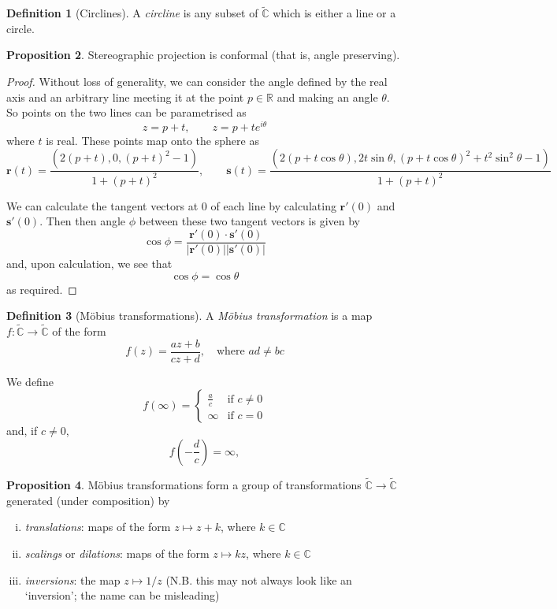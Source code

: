 \documentclass[10pt,fleqn]{article}
\newcommand{\comps}{\mathbb{C}}
\newcommand{\reals}{\mathbb{R}}
\newcommand{\vc}[1]{\boldsymbol{#1}}
\theoremstyle{definition} \newtheorem{defn}{Definition}[section]
\theoremstyle{plain}      \newtheorem{thm}[defn]{Theorem}
\theoremstyle{definition} \newtheorem{prop}[defn]{Proposition}
\theoremstyle{plain}      \newtheorem{lem}[defn]{Lemma}
\theoremstyle{definition} \newtheorem{cor}[defn]{Corollary}
\theoremstyle{definition} \newtheorem{ex}[defn]{Example}
\theoremstyle{definition} \newtheorem{rem}[defn]{Remark}
\begin{document}
\begin{defn}[Circlines]
    A \emph{circline} is any subset of $\tilde{\comps}$ which is either a line or a circle.
\end{defn}

\begin{prop}
    Stereographic projection is conformal (that is, angle preserving).
\end{prop}

\begin{proof}
    Without loss of generality, we can consider the angle defined by the real axis and an arbitrary line meeting it at the point $p\in\reals$ and making an angle $\theta$.
    So points on the two lines can be parametrised as
    \[
        z=p+t,\qquad
        z=p+te^{i\theta}
    \]
    where $t$ is real.
    These points map onto the sphere as
    \[
        \vc{r}(t)=
        \frac{(2(p+t),0,(p+t)^2-1)}{1+(p+t)^2},\qquad
        \vc{s}(t)=
        \frac{(2(p+t\cos\theta),2t\sin\theta,(p+t\cos\theta)^2+t^2\sin^2\theta-1)}{1+(p+t)^2}
    \]

    We can calculate the tangent vectors at $0$ of each line by calculating $\vc{r}'(0)$ and $\vc{s}'(0)$.
    Then then angle $\phi$ between these two tangent vectors is given by
    \[
        \cos\phi=
        \frac{\vc{r}'(0)\cdot\vc{s}'(0)}{|\vc{r}'(0)||\vc{s}'(0)|}
    \]
    and, upon calculation, we see that
    \[
        \cos\phi=
        \cos\theta
    \]
    as required.
\end{proof}

\begin{defn}[M\"obius transformations]
    A \emph{M\"obius transformation} is a map $f:\tilde{\comps}\to\tilde{\comps}$ of the form
    \begin{equation}
        f(z)=
        \frac{az+b}{cz+d},\quad
        \text{where }ad\neq bc
    \end{equation}

    We define
    \[
        f(\infty)=
        \left\{
        \begin{array}{lr}
            \frac{a}{c} & \text{if }c\neq0\\
            \infty & \text{if }c=0
        \end{array}
        \right.
    \]
    and, if $c\neq0$,
    \[
        f(-\frac{d}{c})=
        \infty,
    \]
\end{defn}

\begin{prop}
    M\"obius transformations form a group of transformations $\tilde{\comps}\to\tilde{\comps}$ generated (under composition) by
    \begin{enumerate}[(i)]
        \item \emph{translations}:
        maps of the form $z\mapsto z+k$, where $k\in\comps$
        \item \emph{scalings} or \emph{dilations}:
        maps of the form $z\mapsto kz$, where $k\in\comps$
        \item \emph{inversions}:
        the map $z\mapsto 1/z$ (N.B. this may not always look like an `inversion'; the name can be misleading)
    \end{enumerate}
\end{prop}
\end{document}

